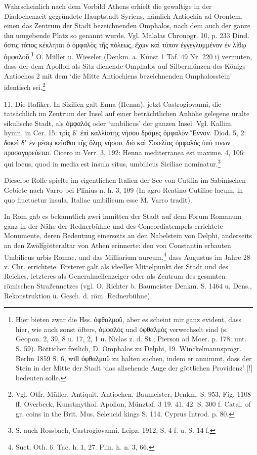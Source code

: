 \documentclass[a4paper, 11pt, oneside]{article}
\begin{document}
Wahrscheinlich nach dem Vorbild Athens erhielt die gewaltige in der Diadochenzeit gegründete Hauptstadt Syriens, nämlich Antiochia ad Orontem, einen das Zentrum der Stadt bezeichnenden Omphalos, nach dem auch der ganze ihn umgebende Platz so genannt wurde. Vgl. Malalas Chronogr. 10, p. 233 Dind. ὅστις τόπος κέκληται ὁ ὀμφαλὸς τῆς πόλεως, ἔχων καὶ τύπον ἐγγεγλυμμένον ἐν λίθῳ ὀμφαλοῦ.\footnote{Hier bieten zwar die Hss. ὀφθαλμοῦ, aber es scheint mir ganz evident, dass hier, wie auch sonst öfters, ὀμφαλός und ὀφθαλμός verwechselt sind (s. Geopon. 2, 39, 8 u. 17, 2, 1 u. Niclas z. d. St.; Pierson ad Moer. p. 178; unt. S. 59). Bötticher freilich, D. Omphalos zu Delphi, 19. Winckelmannsprogr. Berlin 1859 S. 6, will ὀφθαλμοῦ zu halten suchen, indem er annimmt, dass der Stein in der Mitte der Stadt `das allsehende Auge der göttlichen Providenz' [!] bedeuten solle.} O. Müller u. Wieseler (Denkm. a. Kunst 1 Taf. 49 Nr. 220 i) vermuten, dass der dem Apollon als Sitz dienende Omphalos auf Silbermünzen des Königs Antiochos 2 mit dem `die Mitte Antiochiens bezeichnenden Omphalosstein' identisch sei.\footnote{Vgl. Otfr. Müller, Antiquit. Antiochen. Baumeister, Denkm. S. 953, Fig. 1108 ff. Overbeck, Kunstmythol. Apollon, Münztaf. 3 19. 41. 42. S. 300 f. Catal. of gr. coins in the Brit. Mus. Seleucid kings S. 114. Cyprus Introd. p. 80.}

11. Die Italiker. In Sizilien galt Enna (Henna), jetzt Castrogiovanni, die tatsächlich im Zentrum der Insel auf einer beträchtlichen Anhöhe gelegene uralte sikulische Stadt, als ὀμφαλός oder `umbilicus' der ganzen Insel. Vgl. Kallim. hymn. in Cer. 15: τρὶς δ᾽ ἐπὶ καλλίστης νήσου δράμες ὀμφαλὸν Ἔνναν. Diod. 5, 2: δοκεῖ δ᾽ ἐν μέσῳ κεῖσθαι τῆς ὅλης νήσου, διὸ καὶ Σικελίας ὀμφαλός ὑπό τινων προσαγορεύεται. Cicero in Verr. 3, 192: Henna mediterranea est maxime. 4, 106: qui locus, quod in media est insula situs, umbilicus Siciliae nominatur.\footnote{S. auch Rossbach, Castrogiovanni. Leipz. 1912, S. 4 f. u. S. 14 f.}

Dieselbe Rolle spielte im eigentlichen Italien der See von Cutilia im Sabinischen Gebiete nach Varro bei Plinius n. h. 3, 109 (In agro Reatino Cutiliae lacum, in quo fluctuetur insula, Italiae umbilicum esse M. Varro tradit).

In Rom gab es bekanntlich zwei inmitten der Stadt auf dem Forum Romanum ganz in der Nähe der Rednerbühne und des Concordiatempels errichtete Monumente, deren Bedeutung einerseits an den Nabelstein von Delphi, anderseits an den Zwölfgötteraltar von Athen erinnerte: den von Constantin erbauten Umbilicus urbis Romae, und das Milliarium aureum,\footnote{Suet. Oth. 6. Tac. h. 1, 27. Plin. h. n. 3, 66.} dass Augustus im Jahre 28 v. Chr. errichtete. Ersterer galt als ideeller Mittelpunkt der Stadt und des Reiches, letzteres als Generalmeilenzeiger oder als Zentrum des gesamten römischen Straßennetzes (vgl. O. Richter b. Baumeister Denkm. S. 1464 u. Dens., Rekonstruktion u. Gesch. d. röm. Rednerbühne).
\end{document}
